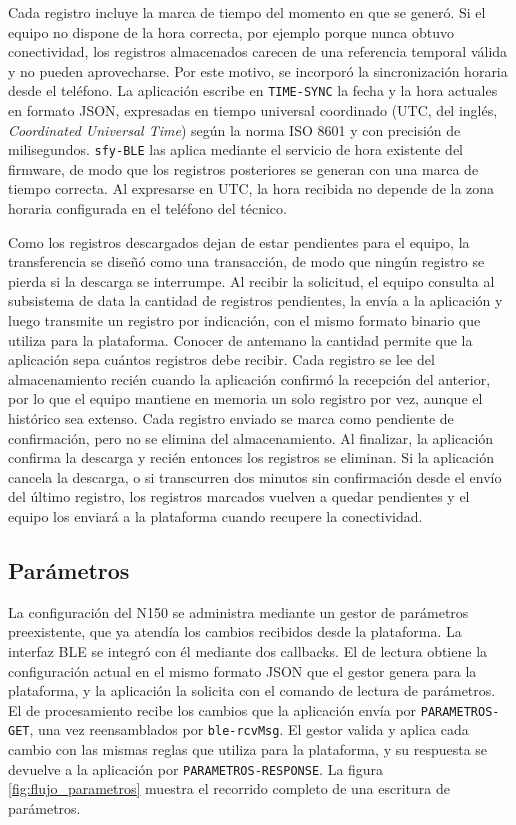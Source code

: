 Cada registro incluye la marca de tiempo del momento en que se generó. Si el equipo no dispone de la hora correcta, por ejemplo porque nunca obtuvo conectividad, los registros almacenados carecen de una referencia temporal válida y no pueden aprovecharse. Por este motivo, se incorporó la sincronización horaria desde el teléfono. La aplicación escribe en \texttt{TIME-SYNC} la fecha y la hora actuales en formato JSON, expresadas en tiempo universal coordinado (UTC, del inglés, \textit{Coordinated Universal Time}) según la norma ISO 8601 y con precisión de milisegundos. \texttt{sfy-BLE} las aplica mediante el servicio de hora existente del firmware, de modo que los registros posteriores se generan con una marca de tiempo correcta. Al expresarse en UTC, la hora recibida no depende de la zona horaria configurada en el teléfono del técnico.

Como los registros descargados dejan de estar pendientes para el equipo, la transferencia se diseñó como una transacción, de modo que ningún registro se pierda si la descarga se interrumpe. Al recibir la solicitud, el equipo consulta al subsistema de data la cantidad de registros pendientes, la envía a la aplicación y luego transmite un registro por indicación, con el mismo formato binario que utiliza para la plataforma. Conocer de antemano la cantidad permite que la aplicación sepa cuántos registros debe recibir. Cada registro se lee del almacenamiento recién cuando la aplicación confirmó la recepción del anterior, por lo que el equipo mantiene en memoria un solo registro por vez, aunque el histórico sea extenso. Cada registro enviado se marca como pendiente de confirmación, pero no se elimina del almacenamiento. Al finalizar, la aplicación confirma la descarga y recién entonces los registros se eliminan. Si la aplicación cancela la descarga, o si transcurren dos minutos sin confirmación desde el envío del último registro, los registros marcados vuelven a quedar pendientes y el equipo los enviará a la plataforma cuando recupere la conectividad.


\FloatBarrier
\subsection{Parámetros}
\label{subsec:integracion_parametros}

La configuración del N150 se administra mediante un gestor de parámetros preexistente, que ya atendía los cambios recibidos desde la plataforma. La interfaz BLE se integró con él mediante dos callbacks. El de lectura obtiene la configuración actual en el mismo formato JSON que el gestor genera para la plataforma, y la aplicación la solicita con el comando de lectura de parámetros. El de procesamiento recibe los cambios que la aplicación envía por \texttt{PARAMETROS-GET}, una vez reensamblados por \texttt{ble-rcvMsg}. El gestor valida y aplica cada cambio con las mismas reglas que utiliza para la plataforma, y su respuesta se devuelve a la aplicación por \texttt{PARAMETROS-RESPONSE}. La figura \ref{fig:flujo_parametros} muestra el recorrido completo de una escritura de parámetros.

